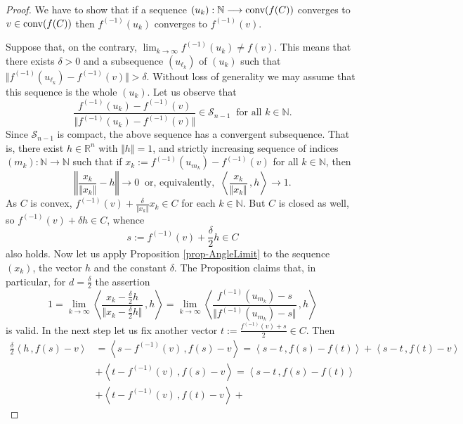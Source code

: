 \documentclass[10pt,a4paper]{amsart}
\newcommand{\NN}{\mathbb{N}}
\newcommand{\Rn}{\mathbb{R}^n}
\newcommand{\nma}{\Vert}
\newcommand{\conv}{\mbox{\rm conv}}
\newcommand{\map}{\longrightarrow}
\newcommand{\bsz}[2]{\left \langle #1 \,, #2 \right \rangle}
\begin{document}
\begin{proof}
We have to show that if a sequence 
$ \left( u_k \right) : \NN \map \conv (f(C)) $ 
converges to $ v \in \conv (f(C)) $ then 
$ f^{(-1)}(u_k) $ converges to $ f^{(-1)} (v) $. 

Suppose that, on the contrary, 
$ \lim_{k \to \infty} f^{(-1)}(u_k) \neq f (v) $. 
This means that there exists $ \delta > 0 $ 
and a subsequence $ \left( u_{\ell_k} \right) $ of 
$ (u_k) $ such that 
$ \nma f^{(-1)} \left( u_{\ell_k} \right) 
- f^{(-1)}  \left( v \right) \nma > \delta $. 
Without loss of generality we may assume that this 
sequence is the whole $ \left( u_k \right) $. 
Let us observe that 
\[
\frac{f^{(-1)}\left( u_k \right) - 
f^{(-1)}\left( v \right)}{\nma f^{(-1)}\left( u_k \right) - 
f^{(-1)}\left( v \right) \nma} 
\in \mathcal{S}_{n-1} 
\ \mbox{ for all } k \in \NN. 
\]
Since $ \mathcal{S}_{n-1} $ is compact, the above sequence 
has a convergent subsequence. 
That is, there exist $ h \in \Rn $ with 
$ \nma h \nma = 1 $, and strictly 
increasing sequence of indices 
$ (m_k) : \NN \map \NN $ such that if 
$ x_k := 
f^{(-1)}\left( u_{m_k} \right) - 
f^{(-1)}\left( v \right) $ 
for all $ k \in \NN $, then 
\[ 
\left\nma \frac{x_k}{\nma x_k \nma} - h \right\nma 
\to 0 
\ \mbox{ or, equivalently, } \ 
\bsz{\frac{x_k}{\nma x_k \nma}}{h} \to 1 . 
\]
As $ C $ is convex, $ f^{(-1)}(v) + 
\frac{\delta}{\nma x_k \nma} x_k  \in C $ for 
each $ k \in \NN $. But $ C $ is closed as well, so 
$ f^{(-1)}(v) + \delta h \in C $, whence 
\[ 
s := f^{(-1)}(v) + \frac{\delta}{2} h \in C 
\] also holds. 
Now let us apply Proposition \ref{prop-AngleLimit} 
to the sequence $ (x_k) $, the vector $ h $ and 
the constant $ \delta $. The Proposition claims that, 
in particular, for $ d=\frac{\delta}{2} $ the assertion 
\begin{equation}\label{eq-thm_Cont1}
1 = \lim_{k \to \infty} 
\bsz{\frac{x_k-\frac{\delta}{2}h}{
\nma x_k - \frac{\delta}{2}h \nma}}{h} 
= 
\lim_{k \to \infty} 
\bsz{\frac{ f^{(-1)}\left( u_{m_k} \right) - s}{
\nma f^{(-1)}\left( u_{m_k} \right) - s \nma}}{h} 
\end{equation} 
is valid. 
In the next step let us fix another vector 
$ t := \frac{f^{(-1)}(v) + s}{2} \in C $. Then 
\begin{align*}
\frac{\delta}{2} \bsz{h}{f(s)-v} & = 
\bsz{s - f^{(-1)}(v)}{f(s)-v} = 
\bsz{s-t}{f(s)-f(t)} + \bsz{s-t}{f(t)-v} \\ 
& + \bsz{t-f^{(-1)}(v)}{f(s)-v} = 
\bsz{s-t}{f(s)-f(t)} \\ 
& + \bsz{t - f^{(-1)}(v)}{f(t)-v} + 

\end{align*}
\end{proof}
\end{document}

